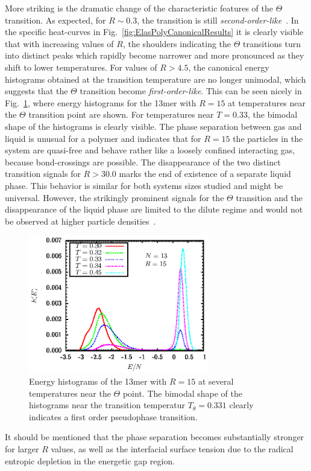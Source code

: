 \documentclass[12pt]{report}
\begin{document}
More striking is the dramatic change of the characteristic features of the $\Theta$ transition. As expected, for $R \sim 0.3$, the transition is still \emph{second-order-like}~\cite{Lifshitz1978,Khokhlov1981}. In the specific heat-curves in Fig.~\ref{fig:ElasPolyCanonicalResults} it is clearly visible that with increasing values of $R$, the shoulders indicating the $\Theta$ transitions turn into distinct peaks which rapidly become narrower and more pronounced as they shift to lower temperatures. For values of  $R > 4.5$, the canonical energy histograms obtained at the transition temperature are no longer unimodal, which suggests that the $\Theta$ transition become \emph{first-order-like}. This can be seen nicely in  Fig.~\ref{fig:ElasPolyhist13}, where energy histograms for the 13mer with $R=15$ at temperatures near the $\Theta$ transition point are shown. For temperatures near $T=0.33$, the bimodal shape of the histograms is clearly visible. The phase separation between gas and liquid is unusual for a polymer and indicates that for $R=15$ the particles in the system are quasi-free and behave rather like a loosely confined interacting gas, because bond-crossings are possible. The disappearance of the two distinct transition signals for $R > 30.0$ marks the end of existence of a separate liquid phase. This behavior is similar for both systems sizes studied and might be universal. However, the strikingly prominent signals for the $\Theta$ transition and the disappearance of the liquid phase are limited to the dilute regime and would not be observed at higher particle densities~\cite{frantz,frant2}. 
%
\begin{figure}
\center
\includegraphics[width = 0.7\textwidth]{chapter5Figs/hist13.eps}
\caption{\label{fig:ElasPolyhist13}%
Energy histograms of the 13mer with $R=15$ at several temperatures near the $\Theta$ point. The bimodal shape of the histograms near the transition temperatur $T_{\theta } = 0.331$ clearly indicates a first order pseudophase transition.}
\end{figure}
%
It should be mentioned that the phase separation becomes substantially stronger for larger $R$ values, as well as the interfacial surface tension due to the radical entropic depletion in the energetic gap region.
\end{document}
